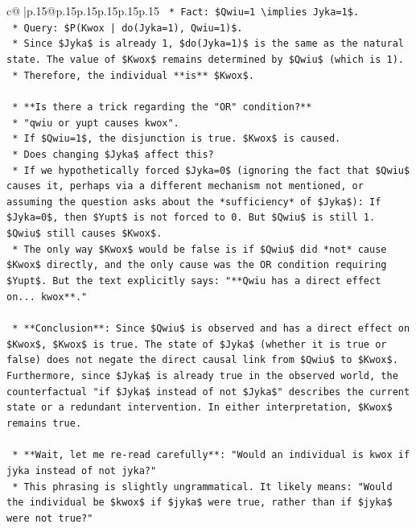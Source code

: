 \documentclass{article}
\begin{document}
{\begin{supertabular}{c@{$\;$}|p{.15\linewidth}@{}p{.15\linewidth}p{.15\linewidth}p{.15\linewidth}p{.15\linewidth}p{.15\linewidth}}
{{{\texttt{        *   Fact: \$Qwiu=1 \textbackslash{}implies Jyka=1\$.} \\
\texttt{        *   Query: \$P(Kwox | do(Jyka=1), Qwiu=1)\$.} \\
\texttt{        *   Since \$Jyka\$ is already 1, \$do(Jyka=1)\$ is the same as the natural state. The value of \$Kwox\$ remains determined by \$Qwiu\$ (which is 1).} \\
\texttt{        *   Therefore, the individual **is** \$Kwox\$.} \\
\\ 
\texttt{    *   **Is there a trick regarding the "OR" condition?**} \\
\texttt{        *   "qwiu or yupt causes kwox".} \\
\texttt{        *   If \$Qwiu=1\$, the disjunction is true. \$Kwox\$ is caused.} \\
\texttt{        *   Does changing \$Jyka\$ affect this?} \\
\texttt{        *   If we hypothetically forced \$Jyka=0\$ (ignoring the fact that \$Qwiu\$ causes it, perhaps via a different mechanism not mentioned, or assuming the question asks about the *sufficiency* of \$Jyka\$): If \$Jyka=0\$, then \$Yupt\$ is not forced to 0. But \$Qwiu\$ is still 1. \$Qwiu\$ still causes \$Kwox\$.} \\
\texttt{        *   The only way \$Kwox\$ would be false is if \$Qwiu\$ did *not* cause \$Kwox\$ directly, and the only cause was the OR condition requiring \$Yupt\$. But the text explicitly says: "**Qwiu has a direct effect on... kwox**."} \\
\\ 
\texttt{    *   **Conclusion**: Since \$Qwiu\$ is observed and has a direct effect on \$Kwox\$, \$Kwox\$ is true. The state of \$Jyka\$ (whether it is true or false) does not negate the direct causal link from \$Qwiu\$ to \$Kwox\$. Furthermore, since \$Jyka\$ is already true in the observed world, the counterfactual "if \$Jyka\$ instead of not \$Jyka\$" describes the current state or a redundant intervention. In either interpretation, \$Kwox\$ remains true.} \\
\\ 
\texttt{    *   **Wait, let me re{-}read carefully**: "Would an individual is kwox if jyka instead of not jyka?"} \\
\texttt{        *   This phrasing is slightly ungrammatical. It likely means: "Would the individual be \$kwox\$ if \$jyka\$ were true, rather than if \$jyka\$ were not true?"} \\
}}}
\end{supertabular}}
\end{document}
